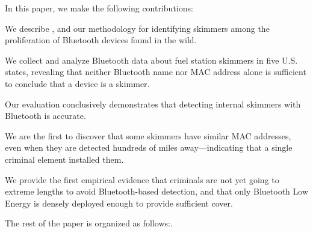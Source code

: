 

In this paper, we make the following contributions:

\begin{prettylist}
%
\item We describe \bluetana, and our methodology for identifying skimmers among
  the proliferation of Bluetooth devices found in the wild.
%
\item We collect and analyze Bluetooth data about fuel station skimmers in five
  U.S.  states, revealing that neither Bluetooth name nor MAC address alone is
  sufficient to conclude that a device is a skimmer.
%
\item Our evaluation conclusively demonstrates that detecting internal skimmers
  with Bluetooth is accurate.
%
\item We are the first to discover that some skimmers have similar MAC
  addresses, even when they are detected hundreds of miles away---indicating
  that a single criminal element installed them.
%
\item We provide the first empirical evidence that criminals are not yet going
  to extreme lengths to avoid Bluetooth-based detection, and that only
  Bluetooth Low Energy is densely deployed enough to provide sufficient cover.
%

\end{prettylist}

The rest of the paper is organized as follows:.




